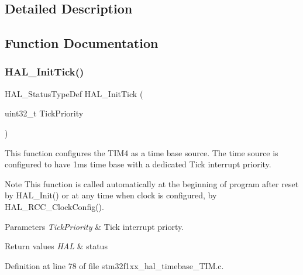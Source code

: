 \subsection{Detailed Description}


\subsection{Function Documentation}
\mbox{\label{group__HAL__TimeBase_ga879cdb21ef051eb81ec51c18147397d5}} 
\subsubsection{\texorpdfstring{H\+A\+L\+\_\+\+Init\+Tick()}{HAL\_InitTick()}}
{\footnotesize\ttfamily H\+A\+L\+\_\+\+Status\+Type\+Def H\+A\+L\+\_\+\+Init\+Tick (\begin{DoxyParamCaption}\item[{uint32\+\_\+t}]{Tick\+Priority }\end{DoxyParamCaption})}



This function configures the T\+I\+M4 as a time base source. The time source is configured to have 1ms time base with a dedicated Tick interrupt priority. 

\begin{DoxyNote}{Note}
This function is called automatically at the beginning of program after reset by H\+A\+L\+\_\+\+Init() or at any time when clock is configured, by H\+A\+L\+\_\+\+R\+C\+C\+\_\+\+Clock\+Config(). 
\end{DoxyNote}

\begin{DoxyParams}{Parameters}
{\em Tick\+Priority} & Tick interrupt priorty. \\
\hline
\end{DoxyParams}

\begin{DoxyRetVals}{Return values}
{\em H\+AL} & status \\
\hline
\end{DoxyRetVals}


Definition at line 78 of file stm32f1xx\+\_\+hal\+\_\+timebase\+\_\+\+T\+I\+M.\+c.

